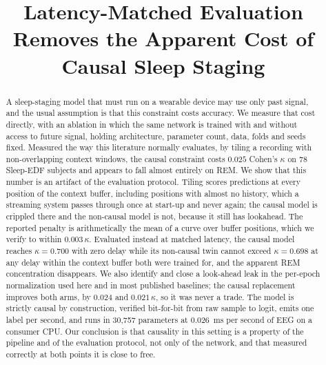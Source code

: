 \documentclass[conference]{IEEEtran}
\begin{document}
\title{Latency-Matched Evaluation Removes the Apparent Cost of\\Causal Sleep Staging}

\author{
}

\maketitle

\begin{abstract}
A sleep-staging model that must run on a wearable device may use only past signal, and
the usual assumption is that this constraint costs accuracy. We measure that cost
directly, with an ablation in which the same network is trained with and without access
to future signal, holding architecture, parameter count, data, folds and seeds fixed.
Measured the way this literature normally evaluates, by tiling a recording with
non-overlapping context windows, the causal constraint costs $0.025$ Cohen's $\kappa$ on
78 Sleep-EDF subjects and appears to fall almost entirely on REM. We show that this
number is an artifact of the evaluation protocol. Tiling scores predictions at every
position of the context buffer, including positions with almost no history, which a
streaming system passes through once at start-up and never again; the causal model is
crippled there and the non-causal model is not, because it still has lookahead. The
reported penalty is arithmetically the mean of a curve over buffer positions, which we
verify to within $0.003\,\kappa$. Evaluated instead at matched latency, the causal model
reaches $\kappa = 0.700$ with zero delay while its non-causal twin cannot exceed
$\kappa = 0.698$ at any delay within the context buffer both were trained for, and the
apparent REM concentration disappears. We also
identify and close a look-ahead leak in the per-epoch normalization used here and in most
published baselines; the causal replacement improves both arms, by $0.024$ and
$0.021\,\kappa$, so it was never a trade. The model is strictly causal by construction,
verified bit-for-bit from raw sample to logit, emits one label per second, and runs in
30{,}757 parameters at $0.026$~ms per second of EEG on a consumer CPU. Our conclusion is
that causality in this setting is a property of the pipeline and of the evaluation
protocol, not only of the network, and that measured correctly at both points it is close
to free.
\end{abstract}
\end{document}
